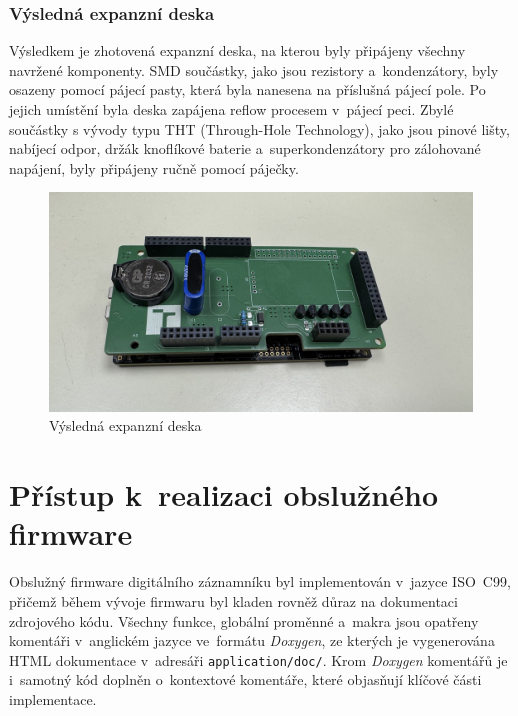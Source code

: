 \subsection{Výsledná expanzní deska}
\label{vysledek}
Výsledkem je zhotovená expanzní deska, na kterou byly připájeny všechny navržené komponenty. SMD součástky, jako jsou rezistory a~kondenzátory, byly osazeny pomocí pájecí pasty, která byla nanesena na příslušná pájecí pole. Po jejich umístění byla deska zapájena reflow procesem v~pájecí peci. Zbylé součástky s vývody typu THT (Through-Hole Technology), jako jsou pinové lišty, nabíjecí odpor, držák knoflíkové baterie a~superkondenzátory pro zálohované napájení, byly připájeny ručně pomocí páječky.

\begin{figure}[h]
    \centering
    \includegraphics[width=1.00\textwidth]{obrazky-figures/datalogger.jpg}
    
    \caption{Výsledná expanzní deska}
    \label{fig:expansion-board}
\end{figure}


\newpage


\chapter{Přístup k~realizaci obslužného firmware}
\label{softwarova_implementace}
Obslužný firmware digitálního záznamníku byl implementován v~jazyce ISO~C99, přičemž během vývoje firmwaru byl kladen rovněž důraz na dokumentaci zdrojového kódu. Všechny funkce, globální proměnné a~makra jsou opatřeny komentáři v~anglickém jazyce ve~formátu \textit{Doxygen}, ze kterých je vygenerována HTML dokumentace v~adresáři \texttt{application/doc/}. Krom \textit{Doxygen} komentářů je i~samotný kód doplněn o~kontextové komentáře, které objasňují klíčové části implementace.

